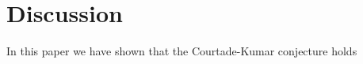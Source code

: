 \label{sec:discussion}
\section{Discussion}
In this paper we have shown that the Courtade-Kumar
conjecture holds %
